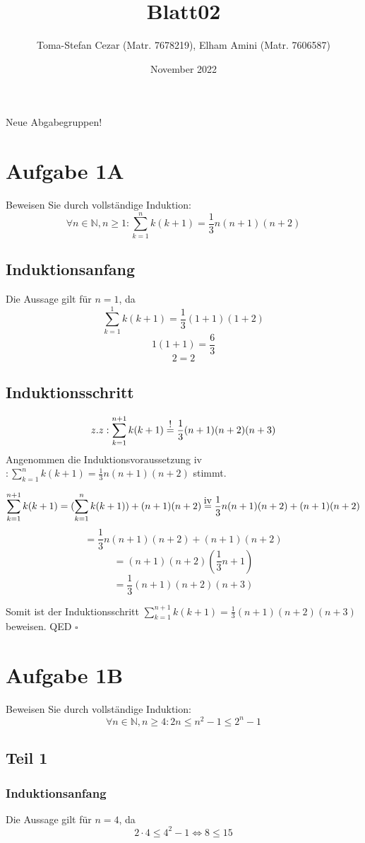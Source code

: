 \documentclass[a4paper]{article}
\title{Blatt02}
\author{Toma-Stefan Cezar (Matr. 7678219), Elham Amini (Matr. 7606587)}
\date{November 2022}
\newcommand\IVeq{\stackrel{\mathclap{\normalfont\mbox{iv}}}{=}}
\newcommand\EXeq{\stackrel{\mathclap{\normalfont\mbox{!}}}{=}}
\newcommand*{\QED}{\null\nobreak\hfill\ensuremath{\square}}%
\begin{document}
\maketitle
Neue Abgabegruppen!
\tableofcontents
\newpage

\section{Aufgabe 1A}

Beweisen Sie durch vollständige Induktion:
\[ \forall n \in \mathbb{N},n \geq 1 :  \sum_{k=1}^n k(k+1) = \frac{1}{3}n(n+1)(n+2)\]

\subsection{Induktionsanfang}
Die Aussage gilt für $n=1$, da
\[ \sum_{k=1}^1 k(k+1) = \frac{1}{3} (1 + 1)(1 + 2) \]
\[ 1(1+1) = \frac{6}{3} \]
\[ 2 = 2 \]

\subsection{Induktionsschritt}

\[ z.z:  \sum_{k=1}^{n+1} k(k+1) \EXeq \frac{1}{3}(n+1)(n+2)(n+3) \]
\newline 
Angenommen die Induktionsvoraussetzung iv $ : \sum_{k=1}^n k(k+1) = \frac{1}{3}n(n+1)(n+2)$ stimmt.

\[ \sum_{k=1}^{n+1} k(k+1) = (\sum_{k=1}^{n} k(k+1)) + (n+1)(n+2) \IVeq \frac{1}{3}n(n+1)(n+2) + (n+1)(n+2)\] 
\[ = \frac{1}{3}n(n+1)(n+2) + (n+1)(n+2) \]
\[ = (n+1)(n+2)(\frac{1}{3}n+1)\]
\[ = \frac{1}{3}(n+1)(n+2)(n+3)\] 

Somit ist der Induktionsschritt $\sum_{k=1}^{n+1} k(k+1) = \frac{1}{3}(n+1)(n+2)(n+3)$ beweisen. QED
\QED

\newpage

\section{Aufgabe 1B}

Beweisen Sie durch vollständige Induktion:
\[ \forall n \in \mathbb{N},n \geq 4 :  2n \leq n^2 - 1 \leq 2^n -1\]

\subsection{Teil 1}

\subsubsection{Induktionsanfang}
Die Aussage gilt für $n=4$, da
\[2 \cdot 4 \leq 4^2 - 1 \Longleftrightarrow  8 \leq 15\]
\end{document}
